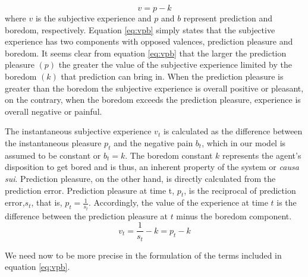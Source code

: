 \documentclass[11pt, onecolumn]{article}
\begin{document}
\begin{equation}
    v =  p - k
\label{eq:vpb}
\end{equation}
where $v$ is the subjective experience and $p$ and $b$ represent prediction and boredom, respectively. 
Equation \ref{eq:vpb} simply states that the subjective experience has two components with opposed valences, prediction pleasure and boredom. It seems clear from equation  \ref{eq:vpb} that the larger the prediction pleasure $(p)$ the greater the value of the subjective experience limited by the boredom $(k)$ that prediction can bring in.  
When the prediction pleasure is greater than the boredom the subjective experience is overall positive or pleasant, on the contrary, when the boredom exceeds the prediction pleasure, experience is overall negative or painful. 

The instantaneous subjective experience $v_t$ is calculated as the difference between the instantaneous pleasure $p_t$ and the negative pain $b_t$, which in our model is assumed to be constant or $b_t=k$. The boredom constant $k$ represents the agent's disposition to get bored and is thus, an inherent property of the system or \emph{causa sui}. Prediction pleasure, on the other hand, is directly calculated from the prediction error.
Prediction pleasure at time t, $p_t$, is the reciprocal of prediction error,$s_t$, that is, $p_t = \frac{1}{s_t}$.
Accordingly, the value of the experience at time $t$ is the difference between the prediction pleasure at $t$ minus the boredom component.
\begin{equation}
    v_t = \frac{1}{s_t} -k = p_t - k
\label{eq:vpbt}
\end{equation}

We need now to be more precise in the formulation of the terms included in equation \ref{eq:vpb}. 
\end{document}
